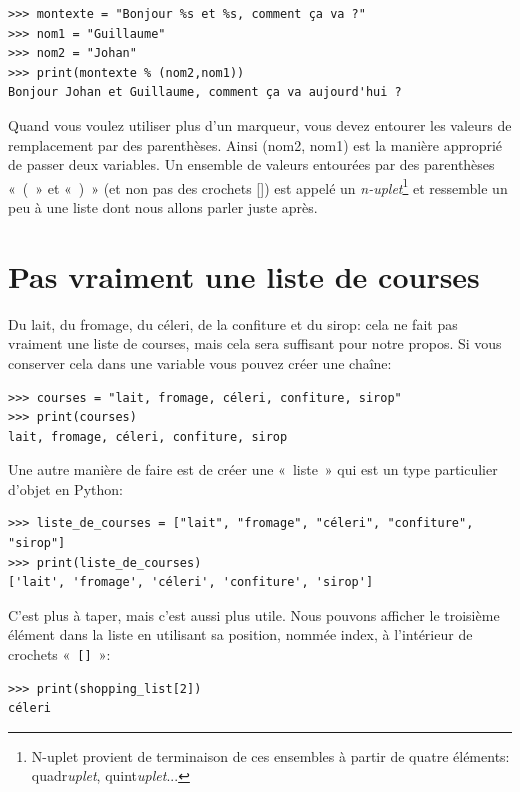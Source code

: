 \begin{Verbatim}[frame=single,rulecolor=\color{mbleu}, label=à taper]
>>> montexte = "Bonjour %s et %s, comment ça va ?"
>>> nom1 = "Guillaume"
>>> nom2 = "Johan"
>>> print(montexte % (nom2,nom1))
Bonjour Johan et Guillaume, comment ça va aujourd'hui ?
\end{Verbatim}

Quand vous voulez utiliser plus d'un marqueur, vous devez entourer les valeurs de remplacement par des parenthèses. Ainsi (nom2, nom1) est la manière approprié de passer deux variables. Un ensemble de valeurs entourées par des parenthèses «~(~» et «~)~» (et non pas des crochets []) est appelé un \emph{n-uplet}\footnote{N-uplet provient de terminaison de ces ensembles à partir de quatre éléments: quadr\emph{uplet}, quint\emph{uplet}...} et ressemble un peu à une liste dont nous allons parler juste après.

\section{Pas vraiment une liste de courses}
Du lait, du fromage, du céleri, de la confiture et du sirop: cela ne fait pas vraiment une liste de courses, mais cela sera suffisant pour notre propos. Si vous conserver cela dans une variable vous pouvez créer une chaîne:

\begin{Verbatim}[frame=single,rulecolor=\color{mbleu}, label=à taper]
>>> courses = "lait, fromage, céleri, confiture, sirop"
>>> print(courses)
lait, fromage, céleri, confiture, sirop
\end{Verbatim}

Une autre manière de faire est de créer une «~liste~» qui est un type particulier d'objet en Python:
\begin{small}
\begin{Verbatim}[frame=single,rulecolor=\color{mbleu}, label=à taper]
>>> liste_de_courses = ["lait", "fromage", "céleri", "confiture", "sirop"]
>>> print(liste_de_courses)
['lait', 'fromage', 'céleri', 'confiture', 'sirop']
\end{Verbatim}
\end{small}
C'est plus à taper, mais c'est aussi plus utile. 
Nous pouvons afficher le troisième élément dans la liste en utilisant sa position, nommée index, à l'intérieur de crochets «~\texttt{[]}~»:

\begin{Verbatim}[frame=single,rulecolor=\color{mbleu}, label=à taper]
>>> print(shopping_list[2])
céleri
\end{Verbatim}

